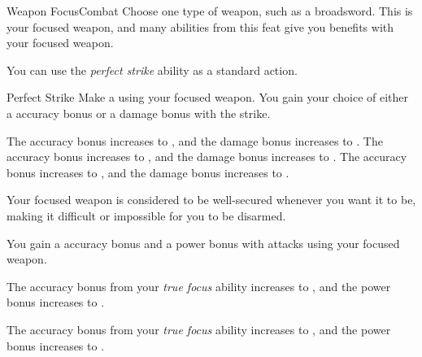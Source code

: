     \begin{feat}{Weapon Focus}{Combat}
         Choose one type of weapon, such as a broadsword.
        This is your focused weapon, and many abilities from this feat give you benefits with your focused weapon.

         You can use the \textit{perfect strike} ability as a standard action.
        \begin{activeability}{Perfect Strike}
            \rankline
            Make a  using your focused weapon.
            You gain your choice of either a  accuracy bonus or a  damage bonus with the strike.

            \rankline
             The accuracy bonus increases to , and the damage bonus increases to .
             The accuracy bonus increases to , and the damage bonus increases to .
             The accuracy bonus increases to , and the damage bonus increases to .
        \end{activeability}

         Your focused weapon is considered to be well-secured whenever you want it to be, making it difficult or impossible for you to be disarmed.

         You gain a  accuracy bonus and a  power bonus with attacks using your focused weapon.

         The accuracy bonus from your \textit{true focus} ability increases to , and the power bonus increases to .

         The accuracy bonus from your \textit{true focus} ability increases to , and the power bonus increases to .
    \end{feat}

